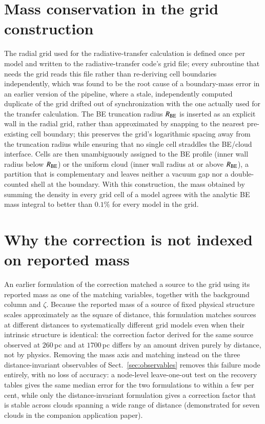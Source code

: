\documentclass{aa}
\begin{document}
\appendix

\section{Mass conservation in the grid construction}
\label{app:massconserv}

The radial grid used for the radiative-transfer calculation is defined once
per model and written to the radiative-transfer code's grid file; every subroutine that
needs the grid reads this file rather than re-deriving cell boundaries
independently, which was found to be the root cause of a boundary-mass
error in an earlier version of the pipeline, where a stale, independently
computed duplicate of the grid drifted out of synchronization with the one
actually used for the transfer calculation. The BE truncation radius
$R_{\rm BE}$ is inserted as an explicit wall in the radial grid, rather than
approximated by snapping to the nearest pre-existing cell boundary; this
preserves the grid's logarithmic spacing away from the truncation radius
while ensuring that no single cell straddles the BE/cloud interface. Cells
are then unambiguously assigned to the BE profile (inner wall radius below
$R_{\rm BE}$) or the uniform cloud (inner wall radius at or above
$R_{\rm BE}$), a partition that is complementary and leaves neither a
vacuum gap nor a double-counted shell at the boundary. With this
construction, the mass obtained by summing the density in every grid cell
of a model agrees with the analytic BE mass integral to better than
$0.1\%$ for every model in the grid.

\section{Why the correction is not indexed on reported mass}
\label{app:distance}

An earlier formulation of the correction matched a source to the grid using
its reported mass as one of the matching variables, together with the
background column and $\zeta$. Because the reported mass of a source
of fixed physical structure scales approximately as the square of distance,
this formulation matches sources at different distances to systematically
different grid models even when their intrinsic structure is identical:
the correction factor derived for the same source observed at $260\,$pc and
at $1700\,$pc differs by an amount driven purely by distance, not by
physics. Removing the mass axis and matching instead on the three
distance-invariant observables of Sect.~\ref{sec:observables} removes this
failure mode entirely, with no loss of accuracy: a node-level leave-one-out
test on the recovery tables gives the same median error for the two
formulations to within a few per cent, while only the distance-invariant
formulation gives a correction factor that is stable across clouds spanning
a wide range of distance (demonstrated for seven clouds in the companion
application paper).
\end{document}
